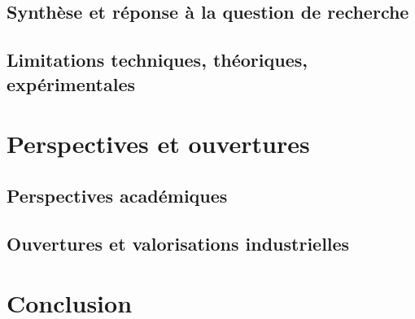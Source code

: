 \section{Synthèse et réponse à la question de recherche}

\section{Limitations techniques, théoriques, expérimentales}

\chapter{Perspectives et ouvertures}
\section{Perspectives académiques}
\section{Ouvertures et valorisations industrielles}

\chapter*{Conclusion}
